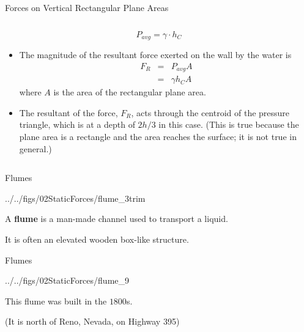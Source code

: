 \documentclass[9pt,xcolor={svgnames, x11names},professionalfonts, mathserif]{beamer}
\begin{document}
\begin{frame}{Forces on Vertical Rectangular Plane Areas}
\begin{columns}
\begin{column}[c]{0.58\textwidth}
\begin{itemize}
				\[	P_{avg}  =  \gamma\cdot h_C   \]
				
				
			\end{itemize}
			\vspace{-6.5cm}
			\begin{itemize}
				\item<6-> The magnitude of the resultant force exerted on the wall by the water is
				\begin{eqnarray*}
					F_R & = & P_{avg}A\\
					& = & \gamma h_C A
				\end{eqnarray*}
				where $A$ is the area of the rectangular plane area.
				\item<7> The resultant of the force, $F_R$, acts through the centroid of the pressure triangle,
				which is at a depth of $2h/3$ in this case. \pars
				(This is true because the plane area is a rectangle and the area reaches the surface; it is not
				true in general.)
			\end{itemize}
		\end{column}
	\end{columns}
\end{frame}


\begin{frame}{Flumes}
	\begin{cfig}[0.3]{../../figs/02StaticForces/flume_3trim}\end{cfig}
	\begin{center}
		A \textbf{flume} is a man-made channel used to transport a liquid.
		
		It is often an elevated wooden box-like structure.
	\end{center}
\end{frame}


\begin{frame}{Flumes}
	\begin{cfig}[0.2]{../../figs/02StaticForces/flume_9}\end{cfig}
	\begin{center}
		This flume was built in the $1800$s.\pars
		
		{\tiny (It is north of Reno, Nevada, on Highway 395)}
	\end{center}
	
\end{frame}
\end{document}
